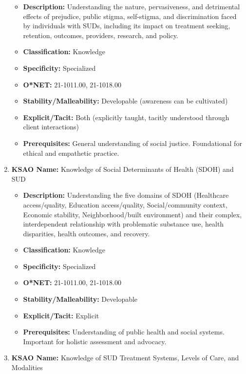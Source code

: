 \documentclass[
  letterpaper,
  DIV=11,
  numbers=noendperiod]{scrartcl}
\providecommand{\tightlist}{%
  \setlength{\itemsep}{0pt}\setlength{\parskip}{0pt}}
\begin{document}
\begin{enumerate}
  \begin{itemize}
  \tightlist
  \item
    \textbf{Description:} Understanding the nature, pervasiveness, and
    detrimental effects of prejudice, public stigma, self-stigma, and
    discrimination faced by individuals with SUDs, including its impact
    on treatment seeking, retention, outcomes, providers, research, and
    policy.
  \item
    \textbf{Classification:} Knowledge
  \item
    \textbf{Specificity:} Specialized
  \item
    \textbf{O*NET:} 21-1011.00, 21-1018.00
  \item
    \textbf{Stability/Malleability:} Developable (awareness can be
    cultivated)
  \item
    \textbf{Explicit/Tacit:} Both (explicitly taught, tacitly understood
    through client interactions)
  \item
    \textbf{Prerequisites:} General understanding of social justice.
    Foundational for ethical and empathetic practice.
  \end{itemize}
\item
  \textbf{KSAO Name:} Knowledge of Social Determinants of Health (SDOH)
  and SUD

  \begin{itemize}
  \tightlist
  \item
    \textbf{Description:} Understanding the five domains of SDOH
    (Healthcare access/quality, Education access/quality,
    Social/community context, Economic stability, Neighborhood/built
    environment) and their complex, interdependent relationship with
    problematic substance use, health disparities, health outcomes, and
    recovery.
  \item
    \textbf{Classification:} Knowledge
  \item
    \textbf{Specificity:} Specialized
  \item
    \textbf{O*NET:} 21-1011.00, 21-1018.00
  \item
    \textbf{Stability/Malleability:} Developable
  \item
    \textbf{Explicit/Tacit:} Explicit
  \item
    \textbf{Prerequisites:} Understanding of public health and social
    systems. Important for holistic assessment and advocacy.
  \end{itemize}
\item
  \textbf{KSAO Name:} Knowledge of SUD Treatment Systems, Levels of
  Care, and Modalities


\end{enumerate}
\end{document}
